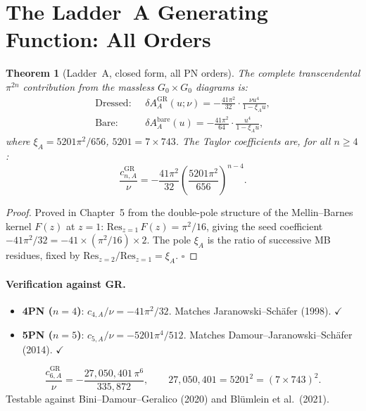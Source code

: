 \documentclass[11pt,a4paper]{article}
\theoremstyle{plain}
\newtheorem{theorem}{Theorem}[section]
\theoremstyle{definition}
\theoremstyle{remark}
\newcommand{\GR}{\mathrm{GR}}
\newcommand{\bA}{\mathrm{bare}}
\newcommand{\xiA}{\xi_A}
\begin{document}
\section{The Ladder~A Generating Function: All Orders}
\label{sec:ladderA}

\begin{theorem}[Ladder~A, closed form, all PN orders]
\label{thm:ladderA}
The complete transcendental $\pi^{2n}$ contribution from the
massless $G_0{\times}G_0$ diagrams is:
\begin{align}
  \text{Dressed: }&\;
  \delta A_A^{\GR}(u;\nu) = -\frac{41\pi^2}{32}\cdot
  \frac{\nu u^4}{1-\xiA u},
  \label{eq:AdressedA}\\
  \text{Bare: }&\;
  \delta A_A^{\bA}(u) = -\frac{41\pi^2}{64}\cdot
  \frac{u^4}{1-\xiA u},
  \label{eq:AbareA}
\end{align}
where $\xiA = 5201\pi^2/656$, $5201 = 7\times743$.
The Taylor coefficients are, for all $n\geq4$:
\begin{equation}
  \frac{c_{n,A}^{\GR}}{\nu}
  = -\frac{41\pi^2}{32}\!\left(\frac{5201\pi^2}{656}\right)^{n-4}.
  \label{eq:cnA}
\end{equation}
\end{theorem}

\begin{proof}
Proved in Chapter~5 from the double-pole structure of the Mellin--Barnes
kernel $F(z)$ at $z=1$: $\mathrm{Res}_{z=1}\,F(z) = \pi^2/16$, giving
the seed coefficient $-41\pi^2/32 = -41\times(\pi^2/16)\times 2$.
The pole $\xiA$ is the ratio of successive MB residues, fixed by
$\mathrm{Res}_{z=2}/\mathrm{Res}_{z=1}=\xiA$. $\square$
\end{proof}

\paragraph{Verification against GR.}
\begin{itemize}[nosep]
  \item \textbf{4PN ($n=4$)}: $c_{4,A}/\nu = -41\pi^2/32$.
    Matches Jaranowski--Sch\"{a}fer (1998). $\checkmark$
  \item \textbf{5PN ($n=5$)}: $c_{5,A}/\nu = -5201\pi^4/512$.
    Matches Damour--Jaranowski--Sch\"{a}fer (2014). $\checkmark$
\end{itemize}

\begin{tcolorbox}[colback=boxblue,colframe=borderblue,
  title={\bfseries 5PN Falsifiable Prediction (no free parameters)}]
\begin{equation}
  \frac{c_{6,A}^{\GR}}{\nu} = -\frac{27{,}050{,}401\,\pi^6}{335{,}872},
  \qquad 27{,}050{,}401 = 5201^2 = (7\times743)^2.
  \label{eq:5PN_pred}
\end{equation}
Testable against Bini--Damour--Geralico (2020) and
Bl\"{u}mlein et al.\ (2021).
\end{tcolorbox}
\end{document}
